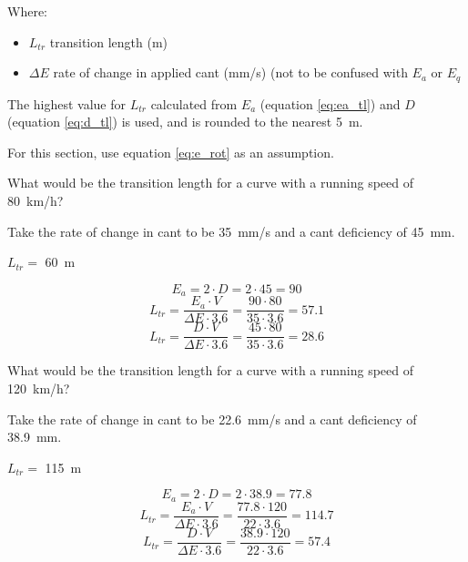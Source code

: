 \documentclass{bcrre_exam}
\begin{document}
Where:
\begin{itemize}
    \item $L_{tr}$ transition length (\unit{m})
    \item $\Delta E$ rate of change in applied cant (\unit{mm/s}) (not to be confused with $E_a$ or $E_q$
\end{itemize}

The highest value for $L_{tr}$ calculated from $E_a$ (equation \ref{eq:ea_tl}) and $D$ (equation \ref{eq:d_tl}) is used, and is rounded to the nearest \qty{5}{m}.

For this section, use equation \ref{eq:e_rot} as an assumption. 

\begin{questions}
    \question
    What would be the transition length for a curve with a running speed of \qty{80}{km/h}?

    Take the rate of change in cant to be \qty{35}{mm/s} and a cant deficiency of \qty{45}{mm}.

    \begin{solution}
        $L_{tr}=$ \qty{60}{m}

        \begin{equation}
            E_a = 2 \cdot D = 2 \cdot 45 = 90
        \end{equation}
        \begin{equation}
            L_{tr}=\frac{E_a \cdot V}{\Delta E \cdot 3.6}=\frac{90 \cdot 80}{35 \cdot 3.6}=57.1
        \end{equation}
        \begin{equation}
            L_{tr}=\frac{D \cdot V}{\Delta E \cdot 3.6}=\frac{45 \cdot 80}{35 \cdot 3.6}=28.6
        \end{equation}
    \end{solution}

    \question
    What would be the transition length for a curve with a running speed of \qty{120}{km/h}?

    Take the rate of change in cant to be \qty{22.6}{mm/s} and a cant deficiency of \qty{38.9}{mm}.

    \begin{solution}
        $L_{tr}=$ \qty{115}{m}

        \begin{equation}
            E_a = 2 \cdot D = 2 \cdot 38.9 = 77.8
        \end{equation}
        \begin{equation}
            L_{tr}=\frac{E_a \cdot V}{\Delta E \cdot 3.6}=\frac{77.8 \cdot 120}{22 \cdot 3.6}=114.7
        \end{equation}
        \begin{equation}
            L_{tr}=\frac{D \cdot V}{\Delta E \cdot 3.6}=\frac{38.9 \cdot 120}{22 \cdot 3.6}=57.4
        \end{equation}
    \end{solution}


\end{questions}
\end{document}
